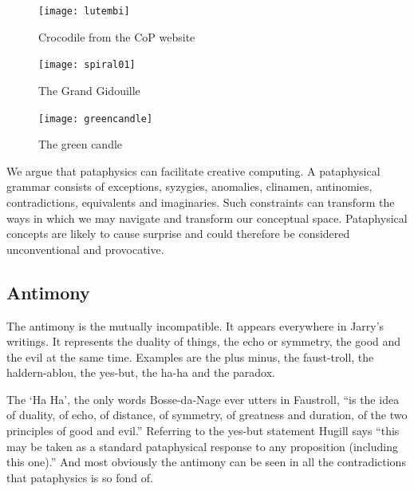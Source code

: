 \begin{figure}[htb]
  \centering
  \begin{minipage}{.275\linewidth}
    \texttt{[image: lutembi]}
  \caption[Crocodile]{Crocodile from the CoP website}
\label{img1}
  \end{minipage}
  \hspace{.05\linewidth}
  \begin{minipage}{.275\linewidth}
    \texttt{[image: spiral01]}
  \caption[Gidouille]{\raggedleft The Grand Gidouille}
\label{img2}
  \end{minipage}
  \hspace{.05\linewidth}
  \begin{minipage}{.275\linewidth}
    \texttt{[image: greencandle]}
  \caption[Green Candle]{The green candle}
\label{img3}
  \end{minipage}
\end{figure}

\begin{draft}
  We argue that pataphysics can facilitate creative computing. A pataphysical grammar consists of exceptions, syzygies, anomalies, clinamen, antinomies, contradictions, equivalents and imaginaries. Such constraints can transform the ways in which we may navigate and transform our conceptual space. Pataphysical concepts are likely to cause surprise and could therefore be considered unconventional and provocative.
\end{draft}


\subsection{Antimony}

The antimony is the mutually incompatible. It appears everywhere in Jarry's writings. It represents the duality of things, the echo or symmetry, the good and the evil at the same time. Examples are the plus minus, the faust-troll, the haldern-ablou, the yes-but, the ha-ha and the paradox.

The `Ha Ha', the only words Bosse-da-Nage ever utters in Faustroll, ``is the idea of duality, of echo, of distance, of symmetry, of greatness and duration, of the two principles of good and evil.'' \autocite{Hugill2012} Referring to the yes-but statement Hugill says ``this may be taken as a standard pataphysical response to any proposition (including this one).'' And most obviously the antimony can be seen in all the contradictions that pataphysics is so fond of.

